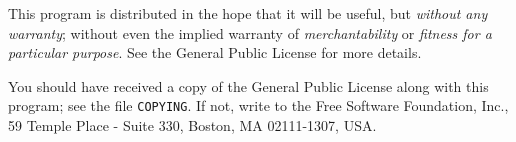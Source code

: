  This program is distributed in the hope that it will be useful,
 but \emph{without any warranty}; without even the implied warranty of
 \emph{merchantability} or \emph{fitness for a particular purpose}.
 See the
  General Public License for more details.

 You should have received a copy of the  General
 Public License
 along with this program; see the file \texttt{COPYING}.  If not,
 write to
 the Free Software Foundation, Inc., 59 Temple Place - Suite 330,
 Boston, MA 02111-1307, USA.





